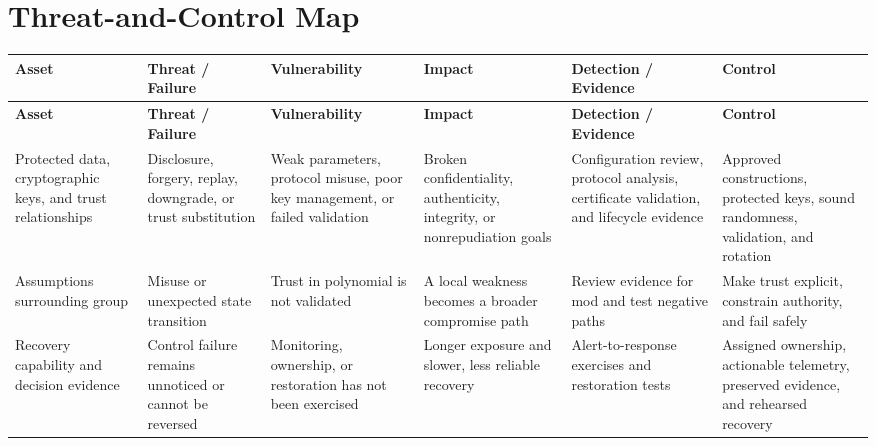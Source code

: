 \documentclass[11pt]{article}
\begin{document}
\section*{Threat-and-Control Map}
\begingroup\scriptsize\setlength{\tabcolsep}{2pt}
\begin{longtable}{>{\RaggedRight\arraybackslash}p{}>{\RaggedRight\arraybackslash}p{}>{\RaggedRight\arraybackslash}p{}>{\RaggedRight\arraybackslash}p{}>{\RaggedRight\arraybackslash}p{}>{\RaggedRight\arraybackslash}p{}}
\toprule\rowcolor{Navy}\color{white}\textbf{Asset} & \color{white}\textbf{Threat / Failure} & \color{white}\textbf{Vulnerability} & \color{white}\textbf{Impact} & \color{white}\textbf{Detection / Evidence} & \color{white}\textbf{Control}\\\midrule
\endfirsthead
\toprule\rowcolor{Navy}\color{white}\textbf{Asset} & \color{white}\textbf{Threat / Failure} & \color{white}\textbf{Vulnerability} & \color{white}\textbf{Impact} & \color{white}\textbf{Detection / Evidence} & \color{white}\textbf{Control}\\\midrule
\endhead
Protected data, cryptographic keys, and trust relationships & Disclosure, forgery, replay, downgrade, or trust substitution & Weak parameters, protocol misuse, poor key management, or failed validation & Broken confidentiality, authenticity, integrity, or nonrepudiation goals & Configuration review, protocol analysis, certificate validation, and lifecycle evidence & Approved constructions, protected keys, sound randomness, validation, and rotation\\\midrule
Assumptions surrounding group & Misuse or unexpected state transition & Trust in polynomial is not validated & A local weakness becomes a broader compromise path & Review evidence for mod and test negative paths & Make trust explicit, constrain authority, and fail safely\\\midrule
Recovery capability and decision evidence & Control failure remains unnoticed or cannot be reversed & Monitoring, ownership, or restoration has not been exercised & Longer exposure and slower, less reliable recovery & Alert-to-response exercises and restoration tests & Assigned ownership, actionable telemetry, preserved evidence, and rehearsed recovery\\\midrule
\bottomrule
\end{longtable}
\endgroup
\end{document}

